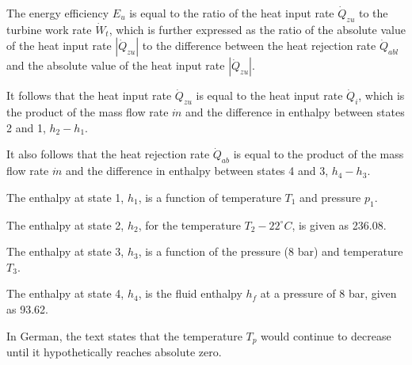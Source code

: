 The energy efficiency \( E_u \) is equal to the ratio of the heat input rate \( \dot{Q}_{zu} \) to the turbine work rate \( \dot{W}_t \), which is further expressed as the ratio of the absolute value of the heat input rate \( |\dot{Q}_{zu}| \) to the difference between the heat rejection rate \( \dot{Q}_{abl} \) and the absolute value of the heat input rate \( |\dot{Q}_{zu}| \).

It follows that the heat input rate \( \dot{Q}_{zu} \) is equal to the heat input rate \( \dot{Q}_i \), which is the product of the mass flow rate \( \dot{m} \) and the difference in enthalpy between states 2 and 1, \( h_2 - h_1 \).

It also follows that the heat rejection rate \( \dot{Q}_{ab} \) is equal to the product of the mass flow rate \( \dot{m} \) and the difference in enthalpy between states 4 and 3, \( h_4 - h_3 \).

The enthalpy at state 1, \( h_1 \), is a function of temperature \( T_1 \) and pressure \( p_1 \).

The enthalpy at state 2, \( h_2 \), for the temperature \( T_2 - 22^\circ C \), is given as 236.08.

The enthalpy at state 3, \( h_3 \), is a function of the pressure (8 bar) and temperature \( T_3 \).

The enthalpy at state 4, \( h_4 \), is the fluid enthalpy \( h_f \) at a pressure of 8 bar, given as 93.62.

In German, the text states that the temperature \( T_p \) would continue to decrease until it hypothetically reaches absolute zero.